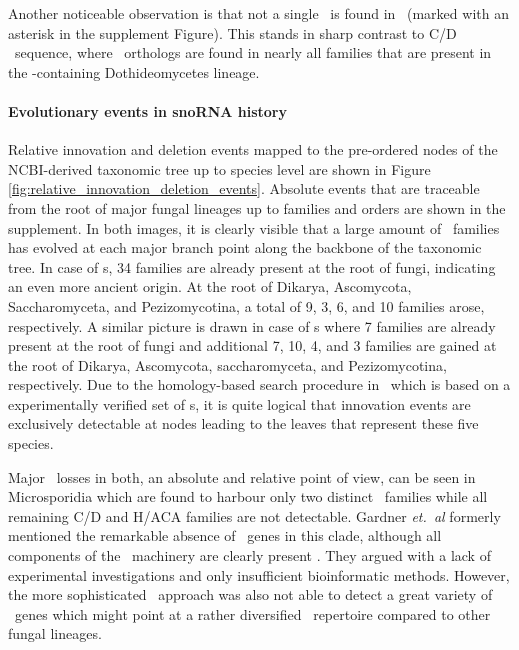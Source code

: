 Another noticeable observation is that not a single \haca\ is
found in \Ptt\ (marked with an asterisk in the supplement Figure). This stands in sharp contrast to C/D \sno\ sequence,
where \ptt\ orthologs are found in nearly all families that are
present in the \ptt-containing Dothideomycetes lineage.


\paragraph{\textbf{Evolutionary events in snoRNA history}}

Relative innovation and deletion events mapped to the pre-ordered
nodes of the NCBI-derived taxonomic tree up to species level are shown in
Figure \ref{fig:relative_innovation_deletion_events}. 
Absolute events that are traceable from the root of major fungal
lineages up to families and orders are shown in the supplement.
In both images, it is clearly
visible that a large amount of \sno\ families has evolved at each
major branch point along the backbone of the taxonomic
tree. In case of \cd s, 34 families are already present at the root of
fungi, indicating an even more ancient origin. At the root of 
Dikarya, Ascomycota, Saccharomyceta, and Pezizomycotina, a total
 of 9, 3, 6, and 10 families arose, respectively. A similar picture is drawn in
case of \haca s where 7 families are already present at the root of
fungi and additional 7, 10, 4, and 3 families are gained at the root
of Dikarya, Ascomycota, saccharomyceta, and Pezizomycotina,
respectively. Due to the homology-based search procedure in \snostrip\
which is based on a experimentally verified set of \sno s, it is quite
logical that innovation events are exclusively detectable at nodes
leading to the leaves that represent these five species.  



Major \sno\ losses in both, an absolute and relative point of view,
can be seen in Microsporidia which are found to harbour only two
distinct \cd\ families while all remaining C/D and H/ACA families are
not detectable. Gardner \emph{et.~al} formerly mentioned the
remarkable absence of \sno\ genes in this clade, although all
components of the \sno\ machinery are clearly present
\cite{Gardner:2010}. They argued with a lack of experimental
investigations and only insufficient bioinformatic methods. However,
the more sophisticated \snostrip\ approach was also not able to detect
a great variety of \sno\ genes which might point at a rather
diversified \sno\ repertoire compared to other fungal lineages. 

